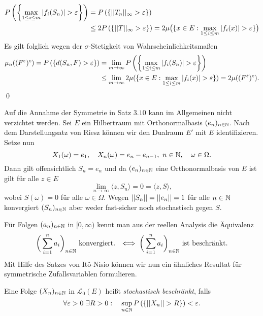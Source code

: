 \begin{proof*}
    \begin{align*}
        P\left(\left\{ \max_{1 \leq i \leq m}\left| f_i(S_n) \right| > \varepsilon \right\}\right) &= P\left(\left\{ \lvert\lvert T_n \rvert\rvert_{\infty} > \varepsilon \right\}\right) \\\
                                                                  &\leq 2 P\left(\left\{ \lvert\lvert T \rvert\rvert_{\infty} > \varepsilon \right\}\right) = 2\mu\big(\{x \in E: \max_{1\leq i \leq m}\left| f_i(x) \right| > \varepsilon\}\big)
    \end{align*}
    Es gilt folglich wegen der $\sigma$-Stetigkeit von Wahrscheinlichkeitsmaßen 
    \begin{align*}
        \mu_n((F^{\varepsilon})^c) = P\left(\left\{ d(S_n, F) > \varepsilon \right\}\right) &= \lim_{m \to \infty}P\left(\left\{ \max_{1 \leq i \leq m}\left| f_i(S_n) \right| > \varepsilon \right\}\right) \\\
                                                                    &\leq \lim_{m \to \infty} 2 \mu(\{x \in E: \max_{1\leq i \leq m}\left| f_i(x) \right| > \varepsilon\})
                                                                    = 2 \mu((F^{\varepsilon})^c).
    \end{align*}
    \qed
\end{proof*}

\begin{remark}
    Auf die Annahme der Symmetrie in Satz $3.10$ kann im Allgemeinen nicht verzichtet werden. Sei $E$ ein Hilbertraum mit Orthonormalbasis $(e_n)_{n \in \mathbb{N}}$.
    Nach dem Darstellungsatz von Riesz können wir den Dualraum $E'$ mit $E$ identifizieren. Setze nun 
    $$
        X_1(\omega) = e_1, \quad X_n(\omega) = e_n - e_{n-1}, \ n \in \mathbb{N}, \quad \omega \in \Omega. 
    $$
    Dann gilt offensichtlich $S_n = e_n$ und da $(e_n)_{n \in \mathbb{N}}$ eine Orthonormalbasis von $E$ ist gilt für alle $z \in E$
    $$
        \lim_{n \to \infty}\langle z,S_n \rangle = 0 = \langle z,S \rangle,
    $$
    wobei $S(\omega) = 0$ für alle $\omega \in \Omega$. Wegen $\lvert\lvert S_n \rvert\rvert = \lvert\lvert e_n \rvert\rvert =1$ für alle $n \in \mathbb{N}$ konvergiert $(S_n)_{n \in \mathbb{N}}$ aber weder fast-sicher noch stochastisch gegen $S$.
    \qexampled 
\end{remark}

Für Folgen $(a_n)_{n \in \mathbb{N}}$ in $[0, \infty)$ kennt man aus der reellen Analysis die Äquivalenz
$$
    \bigg(\sum_{i=1}^n a_i\bigg)_{n \in \mathbb{N}} \text{ konvergiert. } \iff \bigg(\sum_{i=1}^n a_i\bigg)_{n \in \mathbb{N}} \text{ ist beschränkt.}
$$
Mit Hilfe des Satzes von Itô-Nisio können wir nun ein ähnliches Resultat für symmetrische Zufallsvariablen formulieren. 

\begin{mydef}
    Eine Folge $(X_n)_{n \in \mathbb{N}}$ in $\mathcal{L}_0(E)$ heißt \textit{stochastisch beschränkt}, falls
    $$
        \forall \varepsilon >0 \ \exists R > 0: \quad \sup_{n \in \mathbb{N}}P\left(\left\{ \lvert\lvert X_n \rvert\rvert > R \right\}\right) < \varepsilon. 
    $$
\end{mydef}

